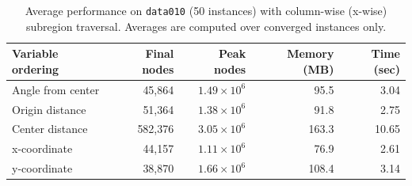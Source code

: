 \begin{table}[t]
\centering
\caption{Average performance on \texttt{data010} (50 instances) with column-wise (x-wise) subregion traversal. Averages are computed over converged instances only.}
\label{tab:ordering_xwise}
\begin{tabular}{lrrrr}
\toprule
Variable ordering & Final nodes & Peak nodes & Memory (MB) & Time (sec) \\
\midrule
Angle from center & 45,864 & $1.49\times 10^{6}$ & 95.5 & 3.04 \\
Origin distance & 51,364 & $1.38\times 10^{6}$ & 91.8 & 2.75 \\
Center distance & 582,376 & $3.05\times 10^{6}$ & 163.3 & 10.65 \\
x-coordinate & 44,157 & $1.11\times 10^{6}$ & 76.9 & 2.61 \\
y-coordinate & 38,870 & $1.66\times 10^{6}$ & 108.4 & 3.14 \\
\bottomrule
\end{tabular}
\end{table}
